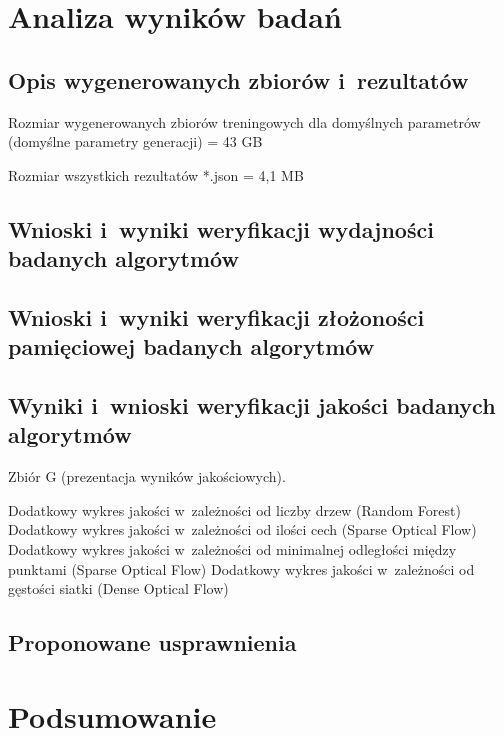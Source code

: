 \chapter{Analiza wyników badań}\label{Chapter_AnalizaRezultatow}

  \section{Opis wygenerowanych zbiorów i~rezultatów}\label{Section_Results}
  Rozmiar wygenerowanych zbiorów treningowych dla domyślnych parametrów (domyślne parametry generacji) = 43 GB

  Rozmiar wszystkich rezultatów *.json = 4,1 MB

  \section{Wnioski i~wyniki weryfikacji wydajności badanych algorytmów}\label{Section_TimingAndOverhead}

  \section{Wnioski i~wyniki weryfikacji złożoności pamięciowej badanych algorytmów}\label{Section_Memory}

  \section{Wyniki i~wnioski weryfikacji jakości badanych algorytmów}\label{Section_Quality}

  Zbiór G (prezentacja wyników jakościowych).

  Dodatkowy wykres jakości w~zależności od liczby drzew (Random Forest)
  Dodatkowy wykres jakości w~zależności od ilości cech (Sparse Optical Flow)
  Dodatkowy wykres jakości w~zależności od minimalnej odległości między punktami (Sparse Optical Flow)
  Dodatkowy wykres jakości w~zależności od gęstości siatki (Dense Optical Flow)

  \section{Proponowane usprawnienia}\label{Section_Usprawnienia}

\chapter{Podsumowanie}\label{Section_Podsumowanie}